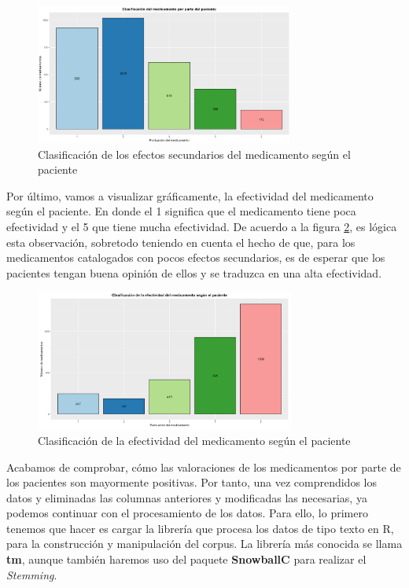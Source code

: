 \documentclass[spanish,]{article}
\begin{document}
\begin{figure}[ht]
    \centering
    \includegraphics[width=0.76\textwidth]{imagenes/grafica_sideEffectsNumber.png}
    \caption{Clasificación de los efectos secundarios del medicamento según el paciente}
    \label{grafica_sideEffectsNumber}
\end{figure}

Por último, vamos a visualizar gráficamente, la efectividad del
medicamento según el paciente. En donde el 1 significa que el
medicamento tiene poca efectividad y el 5 que tiene mucha efectividad.
De acuerdo a la figura \ref{grafica_sideEffectsNumber}, es lógica esta
observación, sobretodo teniendo en cuenta el hecho de que, para los
medicamentos catalogados con pocos efectos secundarios, es de esperar
que los pacientes tengan buena opinión de ellos y se traduzca en una
alta efectividad.

\begin{figure}[h]
    \centering
    \includegraphics[width=0.76\textwidth]{imagenes/grafica_effectivenessNumber.png}
    \caption{Clasificación de la efectividad del medicamento según el paciente}
    \label{grafica_sideEffectsNumber}
\end{figure}

Acabamos de comprobar, cómo las valoraciones de los medicamentos por
parte de los pacientes son mayormente positivas. Por tanto, una vez
comprendidos los datos y eliminadas las columnas anteriores y
modificadas las necesarias, ya podemos continuar con el procesamiento de
los datos. Para ello, lo primero tenemos que hacer es cargar la librería
que procesa los datos de tipo texto en R, para la construcción y
manipulación del corpus. La librería más conocida se llama \textbf{tm},
aunque también haremos uso del paquete \textbf{SnowballC} para realizar
el \emph{Stemming}.
\end{document}
